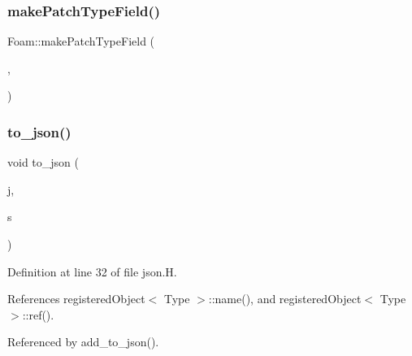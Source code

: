 \mbox{\label{namespaceFoam_a27b517c6bad5ae2558f4a38122b7ab06}} 
\subsubsection{\texorpdfstring{make\+Patch\+Type\+Field()}{makePatchTypeField()}\hspace{0.1cm}{\footnotesize\ttfamily [7/7]}}
{\footnotesize\ttfamily Foam\+::make\+Patch\+Type\+Field (\begin{DoxyParamCaption}\item[{fv\+Patch\+Scalar\+Field}]{,  }\item[{\hyperlink{classFoam_1_1coupledWallHeatFluxTemperatureFvPatchScalarField}{coupled\+Wall\+Heat\+Flux\+Temperature\+Fv\+Patch\+Scalar\+Field}}]{ }\end{DoxyParamCaption})}

\mbox{\label{namespaceFoam_a8f902008c5eedaec2a88f46546efb8d3}} 
\subsubsection{\texorpdfstring{to\+\_\+json()}{to\_json()}\hspace{0.1cm}{\footnotesize\ttfamily [1/2]}}
{\footnotesize\ttfamily void to\+\_\+json (\begin{DoxyParamCaption}\item[{\hyperlink{dictModifier_8C_ab701e3ac61a85b337ec5c1abaad6742d}{json} \&}]{j,  }\item[{const \hyperlink{classFoam_1_1registeredObject}{registered\+Object}$<$ scalar $>$ \&}]{s }\end{DoxyParamCaption})}



Definition at line 32 of file json.\+H.



References registered\+Object$<$ Type $>$\+::name(), and registered\+Object$<$ Type $>$\+::ref().



Referenced by add\+\_\+to\+\_\+json().

